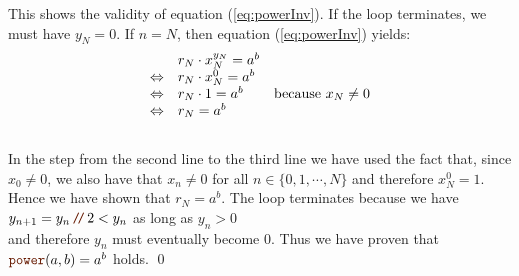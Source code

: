 This shows the validity of equation (\ref{eq:powerInv}).   If the  loop
terminates, we must have $y_N = 0$.  If $n=N$, then equation (\ref{eq:powerInv}) yields:
\\[0.2cm]
\hspace*{1.3cm}
$$
\begin{array}[t]{cll}
                 & r_N \cdot x_N^{y_N} = a^b \\
\Leftrightarrow  & r_N \cdot x_N^{0}  = a^b \\
\Leftrightarrow  & r_N \cdot 1       = a^b  & \mbox{because $x_N \not= 0$} \\
\Leftrightarrow  & r_N               = a^b
\end{array}
$$
\\[0.2cm]
In the step from the second line to the third line we have used the fact that, since $x_0 \not= 0$, we also
have that $x_n \not= 0$ for all $n \in \{0,1, \cdots, N\}$ and therefore $x_N^0 = 1$.  Hence we have shown that $r_N = a^b$.  The
 loop terminates because we have 
\\[0.2cm]
\hspace*{1.3cm}
$y_{n+1} = y_n \dv 2 < y_n$ \quad as long as \quad $y_n > 0$
\\[0.2cm]
and therefore $y_n$ must eventually become $0$.  Thus we have proven that
$\mytt{power}(a,b) =a^b$ holds. \qed


